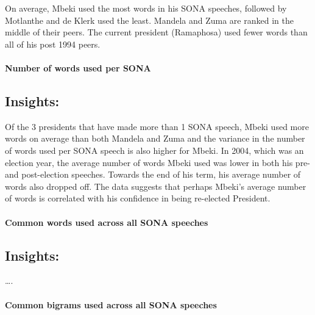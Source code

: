 \documentclass[]{article}
\let\oldparagraph\paragraph
\renewcommand{\paragraph}[1]{\oldparagraph{#1}\mbox{}}
\begin{document}
On average, Mbeki used the most words in his SONA speeches, followed by
Motlanthe and de Klerk used the least. Mandela and Zuma are ranked in
the middle of their peers. The current president (Ramaphosa) used fewer
words than all of his post 1994 peers.

\hypertarget{number-of-words-used-per-sona}{%
\paragraph{\texorpdfstring{\textbf{Number of words used per
SONA}}{Number of words used per SONA}}\label{number-of-words-used-per-sona}}

\hypertarget{insights-1}{%
\subsection{\texorpdfstring{\textbf{Insights:}}{Insights:}}\label{insights-1}}

Of the 3 presidents that have made more than 1 SONA speech, Mbeki used
more words on average than both Mandela and Zuma and the variance in the
number of words used per SONA speech is also higher for Mbeki. In 2004,
which was an election year, the average number of words Mbeki used was
lower in both his pre- and post-election speeches. Towards the end of
his term, his average number of words also dropped off. The data
suggests that perhaps Mbeki's average number of words is correlated with
his confidence in being re-elected President.

\hypertarget{common-words-used-across-all-sona-speeches}{%
\paragraph{\texorpdfstring{\textbf{Common words used across all SONA
speeches}}{Common words used across all SONA speeches}}\label{common-words-used-across-all-sona-speeches}}

\hypertarget{insights-2}{%
\subsection{\texorpdfstring{\textbf{Insights:}}{Insights:}}\label{insights-2}}

\ldots{}.

\hypertarget{common-bigrams-used-across-all-sona-speeches}{%
\paragraph{\texorpdfstring{\textbf{Common bigrams used across all SONA
speeches}}{Common bigrams used across all SONA speeches}}\label{common-bigrams-used-across-all-sona-speeches}}
\end{document}
